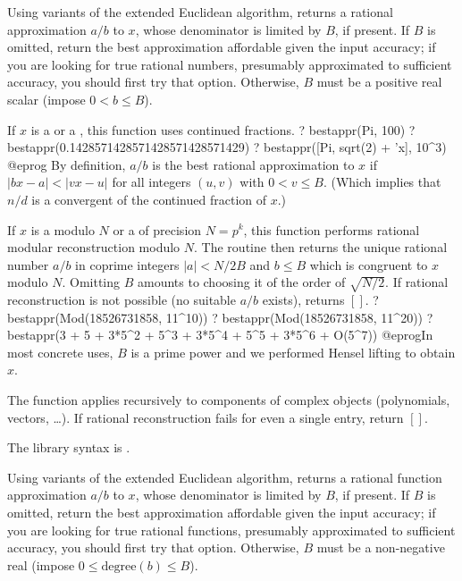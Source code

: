 \label{se:bestappr}
Using variants of the extended Euclidean algorithm, returns a rational
approximation $a/b$ to $x$, whose denominator is limited
by $B$, if present. If $B$ is omitted, return the best approximation
affordable given the input accuracy; if you are looking for true rational
numbers, presumably approximated to sufficient accuracy, you should first
try that option. Otherwise, $B$ must be a positive real scalar (impose
$0 < b \leq B$).

\item If $x$ is a  or a , this function uses continued
fractions.
\bprog
? bestappr(Pi, 100)
? bestappr(0.1428571428571428571428571429)
? bestappr([Pi, sqrt(2) + 'x], 10^3)
@eprog
By definition, $a/b$ is the best rational approximation to $x$ if
$|b x - a| < |v x - u|$ for all integers $(u,v)$ with $0 < v \leq B$.
(Which implies that $n/d$ is a convergent of the continued fraction of $x$.)

\item If $x$ is a  modulo $N$ or a  of precision $N =
p^k$, this function performs rational modular reconstruction modulo $N$. The
routine then returns the unique rational number $a/b$ in coprime integers
$|a| < N/2B$ and $b\leq B$ which is congruent to $x$ modulo $N$. Omitting
$B$ amounts to choosing it of the order of $\sqrt{N/2}$. If rational
reconstruction is not possible (no suitable $a/b$ exists), returns $[]$.
\bprog
? bestappr(Mod(18526731858, 11^10))
? bestappr(Mod(18526731858, 11^20))
? bestappr(3 + 5 + 3*5^2 + 5^3 + 3*5^4 + 5^5 + 3*5^6 + O(5^7))
@eprog\noindent In most concrete uses, $B$ is a prime power and we performed
Hensel lifting to obtain $x$.

The function applies recursively to components of complex objects
(polynomials, vectors, \dots). If rational reconstruction fails for even a
single entry, return $[]$.

The library syntax is .

\label{se:bestapprPade}
Using variants of the extended Euclidean algorithm, returns a rational
function approximation $a/b$ to $x$, whose denominator is limited
by $B$, if present. If $B$ is omitted, return the best approximation
affordable given the input accuracy; if you are looking for true rational
functions, presumably approximated to sufficient accuracy, you should first
try that option. Otherwise, $B$ must be a non-negative real (impose
$0 \leq \text{degree}(b) \leq B$).

